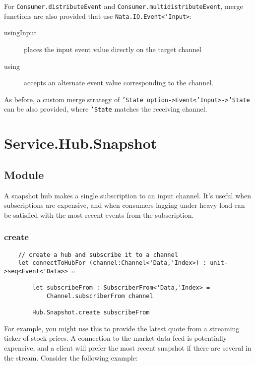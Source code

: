 \documentclass{article}
\begin{document}
For \texttt{Consumer.distributeEvent} and \texttt{Consumer.multidistributeEvent}, merge functions are also provided that use \texttt{Nata.IO.Event<'Input>}:

\begin{description}
    \item[usingInput] places the input event value directly on the target channel
    \item[using] accepts an alternate event value corresponding to the channel.
\end{description}

As before, a custom merge strategy of \texttt{'State option->Event<'Input>->'State} can be also provided, where \texttt{'State} matches the receiving channel.

\clearpage
\section{Service.Hub.Snapshot}
\subsection{Module}

A snapshot hub makes a single subscription to an input channel.  It's useful when subscriptions are expensive, and when consumers lagging under heavy load can be satisfied with the most recent events from the subscription.

\subsubsection{create}

\begin{verbatim}
    // create a hub and subscribe it to a channel
    let connectToHubFor (channel:Channel<'Data,'Index>) : unit->seq<Event<'Data>> =
    
        let subscribeFrom : SubscriberFrom<'Data,'Index> =
            Channel.subscriberFrom channel
    
        Hub.Snapshot.create subscribeFrom
\end{verbatim}

For example, you might use this to provide the latest quote from a streaming ticker of stock prices.  A connection to the market data feed is potentially expensive, and a client will prefer the most recent snapshot if there are several in the stream.  Consider the following example:
\end{document}
